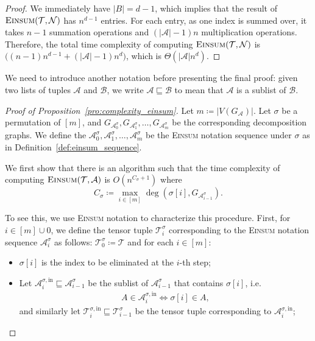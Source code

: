 \documentclass[sn-mathphys, natbib=false]{sn-jnl}
\theoremstyle{plain}
\theoremstyle{definition}
\def\Einsum{\textsc{Einsum}}
\newcommand{\tensorcontraction}{\textsc{Einsum}}
\newcommand{\degp}[2]{\deg(#1,#2)}
\newcommand{\verticesp}[1]{V(#1)}
\newcommand{\graphform}[1]{G_{#1}}
\newcommand{\less}{O}
\newcommand{\appequal}{\Theta}
\def\calA{\mathcal{A}}
\def\calB{\mathcal{B}}
\def\calT{\mathcal{T}}
\def\calN{\mathcal{N}}
\begin{document}
\begin{bibunit}[agsm]
\begin{proof}
We immediately have $|B| = d - 1$, which implies that the result of $\tensorcontraction(\calT, \calN)$ has $n^{d-1}$ entries. For each entry, as one index is summed over, it takes $n-1$ summation operations and $(|\calA|-1)n$ multiplication operations. Therefore, the total time complexity of computing $\tensorcontraction(\calT, \calN)$ is $\big((n-1)n^{d-1} + (|\calA|-1)n^d\big)$, which is $\appequal(|\calA|n^{d})$. 
\end{proof}

We need to introduce another notation before presenting the final proof: given two lists of tuples $\calA$ and $\calB$, we write $\calA \sqsubseteq \calB$ to mean that $\calA$ is a sublist of $\calB$.

\begin{proof}[Proof of Proposition~\ref{pro:complexity_einsum}]    
Let $m \coloneqq |\verticesp{G_\calA}|$. Let $\sigma$ be a permutation of $[m]$, and $\graphform{\calA^{\sigma}_0}, \graphform{\calA^{\sigma}_1}, \ldots, \graphform{\calA^{\sigma}_m}$ be the corresponding decomposition graphs. We define the $\calA^{\sigma}_0, \calA^{\sigma}_1, \ldots, \calA^{\sigma}_m$ be the \Einsum{} notation sequence under $\sigma$ as in Definition~\ref{def:einsum_sequence}.
    
We first show that there is an algorithm such that the time complexity of computing $\tensorcontraction(\calT, \calA)$ is $\less(n^{C_\sigma + 1}) $ where
\begin{equation*}
C_\sigma \coloneqq \max_{i \in [m]} \degp{\sigma[i]}{\graphform{\calA^{\sigma}_{i-1}}}.
\end{equation*}

To see this, we use \Einsum{} notation to characterize this procedure. First, for $i \in [m] \cup {0}$, we define the tensor tuple $\calT^\sigma_i$ corresponding to the \Einsum{} notation sequence $\calA^\sigma_i$ as follows: $\calT^{\sigma}_{0} \coloneqq \calT$ and for each $i \in [m]$:
\begin{itemize}
    \item $\sigma[i]$ is the index to be eliminated at the $i$-th step;
    \item Let $\calA^{\sigma, \mathrm{in}}_i \sqsubseteq \calA^{\sigma}_{i-1}$ be the sublist of $\calA^{\sigma}_{i-1}$ that contains $\sigma[i]$, i.e.
    \begin{align*}
    A \in \calA^{\sigma, \mathrm{in}}_i \iff \sigma[i] \in A,
    \end{align*}
    and similarly let $\calT^{\sigma, \mathrm{in}}_i \sqsubseteq \calT^{\sigma}_{i-1}$ be the tensor tuple corresponding to $\calA^{\sigma, \mathrm{in}}_i $;
    

\end{itemize}
\end{proof}
\end{bibunit}
\end{document}
